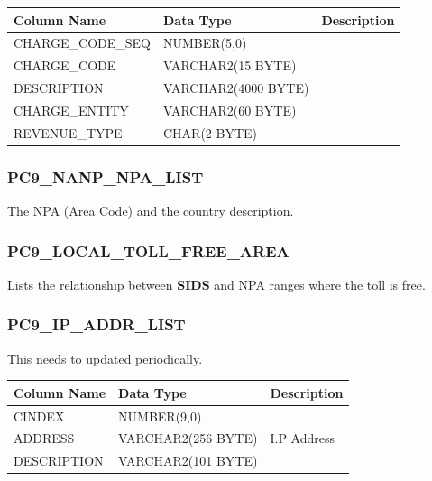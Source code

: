 \documentclass[12pt,twoside]{article}
\begin{document}
\begin{center}
\begin{tabular}{lll}
\hline
 \textbf{Column Name}  &  \textbf{Data Type}   &  \textbf{Description}  \\
\hline
 CHARGE\_CODE\_SEQ     &  NUMBER(5,0)          &                        \\
 CHARGE\_CODE          &  VARCHAR2(15 BYTE)    &                        \\
 DESCRIPTION           &  VARCHAR2(4000 BYTE)  &                        \\
 CHARGE\_ENTITY        &  VARCHAR2(60 BYTE)    &                        \\
 REVENUE\_TYPE         &  CHAR(2 BYTE)         &                        \\
\hline
\end{tabular}
\end{center}



\normalsize
\subsubsection{PC9\_NANP\_NPA\_LIST}
\label{sec-9-14-15}

   The NPA (Area Code) and the country description.
   
\subsubsection{PC9\_LOCAL\_TOLL\_FREE\_AREA}
\label{sec-9-14-16}

   Lists the relationship between \textbf{SIDS} and NPA ranges where the toll
   is free.
\subsubsection{PC9\_IP\_ADDR\_LIST}
\label{sec-9-14-17}

    This needs to updated periodically.
\scriptsize

\begin{center}
\begin{tabular}{lll}
\hline
 \textbf{Column Name}  &  \textbf{Data Type}  &  \textbf{Description}  \\
\hline
 CINDEX                &  NUMBER(9,0)         &                        \\
 ADDRESS               &  VARCHAR2(256 BYTE)  &  I.P Address           \\
 DESCRIPTION           &  VARCHAR2(101 BYTE)  &                        \\
\hline
\end{tabular}
\end{center}
\end{document}
